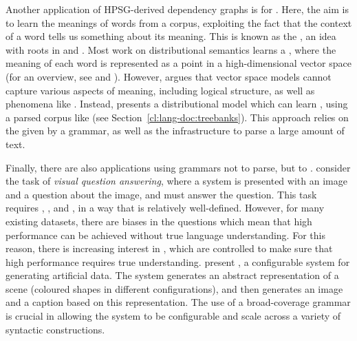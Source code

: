 \documentclass[output=paper,nonflat]{langsci/langscibook}
\begin{document}
Another application of HPSG-derived dependency graphs
is for \textit{}.
Here, the aim is to learn the meanings of words from a corpus,
exploiting the fact that the context of a word tells us something about its meaning.
This is known as the \textit{},
an idea with roots in  \citep{harris1954distribution}
and  \citep{firth1951collocation,firth1957company}.
Most work on distributional semantics learns a \textit{},
where the meaning of each word is represented as a point in a high-dimensional vector space
(for an overview, see \citealt{erk2012vector} and \citealt{clark2015vector}).
However, \citet{emerson2018functional} argues that
vector space models cannot capture various aspects of meaning,
including logical structure, as well as phenomena like .
Instead, \citeauthor{emerson2018functional} presents a distributional model
which can learn ,
using a parsed corpus like  (see Section~\ref{cl:lang-doc:treebanks}).
This approach relies on the  given by a grammar,
as well as the infrastructure to parse a large amount of text.

Finally, there are also applications using grammars not to parse, but to .
\citet{kuhnle2018shapeworld} consider the task of \textit{visual question answering},
where a system is presented with an image and a question about the image,
and must answer the question.
This task requires , , and ,
in a way that is relatively well-defined.
However, for many existing datasets, there are biases in the questions
which mean that high performance can be achieved without true language understanding.
For this reason, there is increasing interest in ,
which are controlled to make sure that high performance requires true understanding.
\citeauthor{kuhnle2018shapeworld} present ,
a configurable system for generating artificial data.
The system generates an abstract representation of a scene
(coloured shapes in different configurations),
and then generates an image and a caption based on this representation.
The use of a broad-coverage grammar is crucial
in allowing the system to be configurable
and scale across a variety of syntactic constructions.

\end{document}

